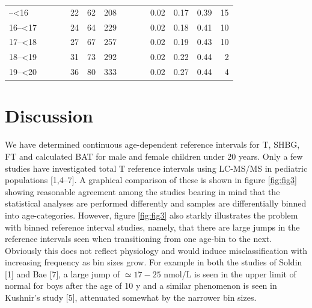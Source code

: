 \documentclass[]{elsarticle} %
\begin{document}
\begin{table}[H]
\begin{tabular}[t]{l>{}r>{}r>{}rrrr>{}r>{}r>{}rrrrr}
\addlinespace
15--<16 & \cellcolor[HTML]{ececec}{0.08} & \cellcolor[HTML]{ececec}{0.56} & \cellcolor[HTML]{ececec}{1.47} & 22 & 62 & 208 & \cellcolor[HTML]{ececec}{0.99} & \cellcolor[HTML]{ececec}{7.29} & \cellcolor[HTML]{ececec}{16.50} & 0.02 & 0.17 & 0.39 & 15\\
16--<17 & \cellcolor[HTML]{ececec}{0.11} & \cellcolor[HTML]{ececec}{0.55} & \cellcolor[HTML]{ececec}{1.41} & 24 & 64 & 229 & \cellcolor[HTML]{ececec}{1.00} & \cellcolor[HTML]{ececec}{7.57} & \cellcolor[HTML]{ececec}{17.44} & 0.02 & 0.18 & 0.41 & 10\\
17--<18 & \cellcolor[HTML]{ececec}{0.16} & \cellcolor[HTML]{ececec}{0.60} & \cellcolor[HTML]{ececec}{1.36} & 27 & 67 & 257 & \cellcolor[HTML]{ececec}{1.00} & \cellcolor[HTML]{ececec}{8.14} & \cellcolor[HTML]{ececec}{18.13} & 0.02 & 0.19 & 0.43 & 10\\
18--<19 & \cellcolor[HTML]{ececec}{0.21} & \cellcolor[HTML]{ececec}{0.74} & \cellcolor[HTML]{ececec}{1.38} & 31 & 73 & 292 & \cellcolor[HTML]{ececec}{0.97} & \cellcolor[HTML]{ececec}{9.38} & \cellcolor[HTML]{ececec}{18.58} & 0.02 & 0.22 & 0.44 & 2\\
19--<20 & \cellcolor[HTML]{ececec}{0.28} & \cellcolor[HTML]{ececec}{1.00} & \cellcolor[HTML]{ececec}{1.48} & 36 & 80 & 333 & \cellcolor[HTML]{ececec}{0.92} & \cellcolor[HTML]{ececec}{11.38} & \cellcolor[HTML]{ececec}{18.78} & 0.02 & 0.27 & 0.44 & 4\\
\bottomrule
\end{tabular}
\end{table}

\hypertarget{discussion}{%
\section{Discussion}\label{discussion}}

We have determined continuous age-dependent reference intervals for T,
SHBG, FT and calculated BAT for male and female children under 20 years.
Only a few studies have investigated total T reference intervals using
LC-MS/MS in pediatric populations {[}1,4--7{]}. A graphical comparison
of these is shown in figure \ref{fig:fig3} showing reasonable agreement
among the studies bearing in mind that the statistical analyses are
performed differently and samples are differentially binned into
age-categories. However, figure \ref{fig:fig3} also starkly illustrates
the problem with binned reference interval studies, namely, that there
are large jumps in the reference intervals seen when transitioning from
one age-bin to the next. Obviously this does not reflect physiology and
would induce misclassification with increasing frequency as bin sizes
grow. For example in both the studies of Soldin {[}1{]} and Bae {[}7{]},
a large jump of \(\simeq 17-25\) nmol/L is seen in the upper limit of
normal for boys after the age of 10 y and a similar phenomenon is seen
in Kushnir's study {[}5{]}, attenuated somewhat by the narrower bin
sizes.
\end{document}
